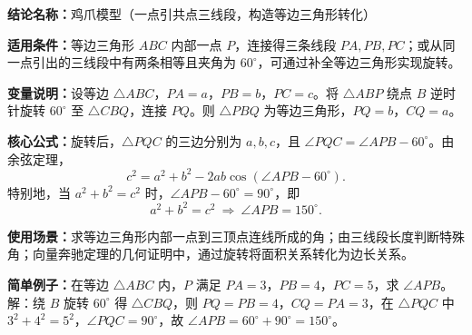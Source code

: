 \textbf{结论名称：}鸡爪模型（一点引共点三线段，构造等边三角形转化）

\textbf{适用条件：}等边三角形 \(ABC\) 内部一点 \(P\)，连接得三条线段 \(PA, PB, PC\)；或从同一点引出的三线段中有两条相等且夹角为 \(60^\circ\)，可通过补全等边三角形实现旋转。

\textbf{变量说明：}设等边 \(\triangle ABC\)，\(PA = a\)，\(PB = b\)，\(PC = c\)。将 \(\triangle ABP\) 绕点 \(B\) 逆时针旋转 \(60^\circ\) 至 \(\triangle CBQ\)，连接 \(PQ\)。则 \(\triangle PBQ\) 为等边三角形，\(PQ = b\)，\(CQ = a\)。

\textbf{核心公式：}旋转后，\(\triangle PQC\) 的三边分别为 \(a, b, c\)，且 \(\angle PQC = \angle APB - 60^\circ\)。由余弦定理，
\[
c^2 = a^2 + b^2 - 2ab\cos(\angle APB - 60^\circ).
\]
特别地，当 \(a^2 + b^2 = c^2\) 时，\(\angle APB - 60^\circ = 90^\circ\)，即
\[
\boxed{a^2 + b^2 = c^2 \ \Longrightarrow\ \angle APB = 150^\circ}.
\]

\textbf{使用场景：}求等边三角形内部一点到三顶点连线所成的角；由三线段长度判断特殊角；向量奔驰定理的几何证明中，通过旋转将面积关系转化为边长关系。

\textbf{简单例子：}在等边 \(\triangle ABC\) 内，\(P\) 满足 \(PA = 3\)，\(PB = 4\)，\(PC = 5\)，求 \(\angle APB\)。  
解：绕 \(B\) 旋转 \(60^\circ\) 得 \(\triangle CBQ\)，则 \(PQ = PB = 4\)，\(CQ = PA = 3\)，在 \(\triangle PQC\) 中 \(3^2 + 4^2 = 5^2\)，\(\angle PQC = 90^\circ\)，故 \(\angle APB = 60^\circ + 90^\circ = 150^\circ\)。